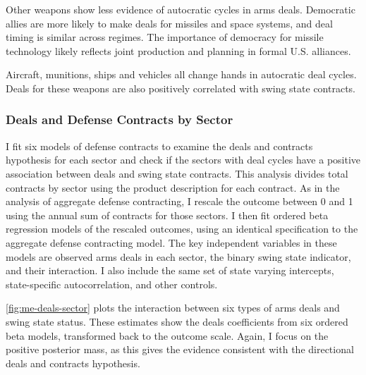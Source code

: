 \documentclass[12pt]{article}
\begin{document}
Other weapons show less evidence of autocratic cycles in arms deals. 
Democratic allies are more likely to make deals for missiles and space systems, and deal timing is similar across regimes. 
The importance of democracy for missile technology likely reflects joint production and planning in formal U.S. alliances. 


Aircraft, munitions, ships and vehicles all change hands in autocratic deal cycles. 
Deals for these weapons are also positively correlated with swing state contracts.  



\subsubsection{Deals and Defense Contracts by Sector}


I fit six models of defense contracts to examine the deals and contracts hypothesis for each sector and check if the sectors with deal cycles have a positive association between deals and swing state contracts. 
This analysis divides total contracts by sector using the product description for each contract. 
As in the analysis of aggregate defense contracting, I rescale the outcome between 0 and 1 using the annual sum of contracts for those sectors. 
I then fit ordered beta regression models of the rescaled outcomes, using an identical specification to the aggregate defense contracting model.
The key independent variables in these models are observed arms deals in each sector, the binary swing state indicator, and their interaction. 
I also include the same set of state varying intercepts, state-specific autocorrelation, and other controls. 


\autoref{fig:me-deals-sector} plots the interaction between six types of arms deals and swing state status.  
These estimates show the deals coefficients from six ordered beta models, transformed back to the outcome scale. 
Again, I focus on the positive posterior mass, as this gives the evidence consistent with the directional deals and contracts hypothesis.
\end{document}
